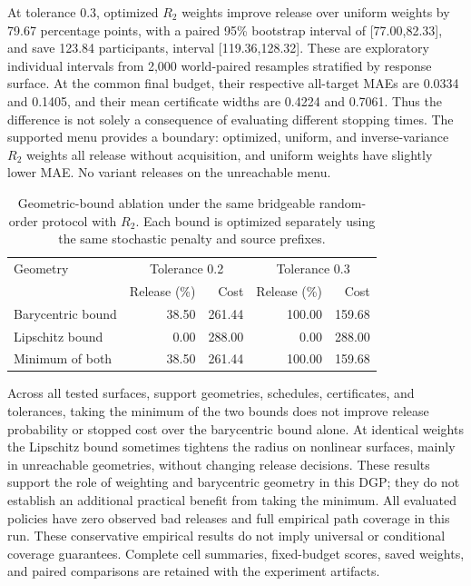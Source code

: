 At tolerance 0.3, optimized $R_2$ weights improve release over uniform weights by 79.67 percentage points, with a paired 95\% bootstrap interval of [77.00,82.33], and save 123.84 participants, interval [119.36,128.32]. These are exploratory individual intervals from 2,000 world-paired resamples stratified by response surface. At the common final budget, their respective all-target MAEs are 0.0334 and 0.1405, and their mean certificate widths are 0.4224 and 0.7061. Thus the difference is not solely a consequence of evaluating different stopping times. The supported menu provides a boundary: optimized, uniform, and inverse-variance $R_2$ weights all release without acquisition, and uniform weights have slightly lower MAE. No variant releases on the unreachable menu.

\begin{table}[htbp]
\centering\small
\caption{Geometric-bound ablation under the same bridgeable random-order protocol with $R_2$. Each bound is optimized separately using the same stochastic penalty and source prefixes.}
\label{tab:ablation_geometry}
\begin{tabular}{lrr rr}
\toprule
Geometry & \multicolumn{2}{c}{Tolerance 0.2} & \multicolumn{2}{c}{Tolerance 0.3} \\
 & Release (\%) & Cost & Release (\%) & Cost \\
\midrule
Barycentric bound & 38.50 & 261.44 & 100.00 & 159.68 \\
Lipschitz bound & 0.00 & 288.00 & 0.00 & 288.00 \\
Minimum of both & 38.50 & 261.44 & 100.00 & 159.68 \\
\bottomrule
\end{tabular}
\end{table}

Across all tested surfaces, support geometries, schedules, certificates, and tolerances, taking the minimum of the two bounds does not improve release probability or stopped cost over the barycentric bound alone. At identical weights the Lipschitz bound sometimes tightens the radius on nonlinear surfaces, mainly in unreachable geometries, without changing release decisions. These results support the role of weighting and barycentric geometry in this DGP; they do not establish an additional practical benefit from taking the minimum. All evaluated policies have zero observed bad releases and full empirical path coverage in this run. These conservative empirical results do not imply universal or conditional coverage guarantees. Complete cell summaries, fixed-budget scores, saved weights, and paired comparisons are retained with the experiment artifacts.

